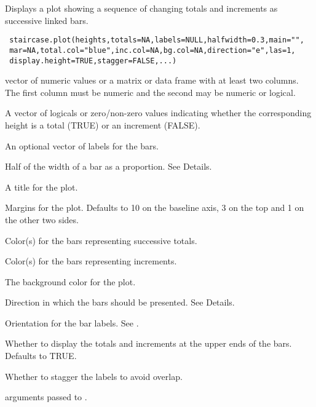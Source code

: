 \begin{Description}\relax
Displays a plot showing a sequence of changing totals and increments as
successive linked bars.
\end{Description}
\begin{Usage}
\begin{verbatim}
 staircase.plot(heights,totals=NA,labels=NULL,halfwidth=0.3,main="",
 mar=NA,total.col="blue",inc.col=NA,bg.col=NA,direction="e",las=1,
 display.height=TRUE,stagger=FALSE,...)
\end{verbatim}
\end{Usage}
\begin{Arguments}
\begin{ldescription}
\item[\code{heights}] vector of numeric values or a matrix or data frame with at least
two columns. The first column must be numeric and the second may be numeric or
logical.
\item[\code{totals}] A vector of logicals or zero/non-zero values indicating whether
the corresponding height is a total (TRUE) or an increment (FALSE).
\item[\code{labels}] An optional vector of labels for the bars.
\item[\code{halfwidth}] Half of the width of a bar as a proportion. See Details.
\item[\code{main}] A title for the plot.
\item[\code{mar}] Margins for the plot. Defaults to 10 on the baseline axis, 3 on the
top and 1 on the other two sides.
\item[\code{total.col}] Color(s) for the bars representing successive totals.
\item[\code{inc.col}] Color(s) for the bars representing increments.
\item[\code{bg.col}] The background color for the plot.
\item[\code{direction}] Direction in which the bars should be presented. See Details.
\item[\code{las}] Orientation for the bar labels. See .
\item[\code{display.height}] Whether to display the totals and increments at the upper
ends of the bars. Defaults to TRUE.
\item[\code{stagger}] Whether to stagger the labels to avoid overlap.
\item[\code{...}] arguments passed to .
\end{ldescription}
\end{Arguments}
